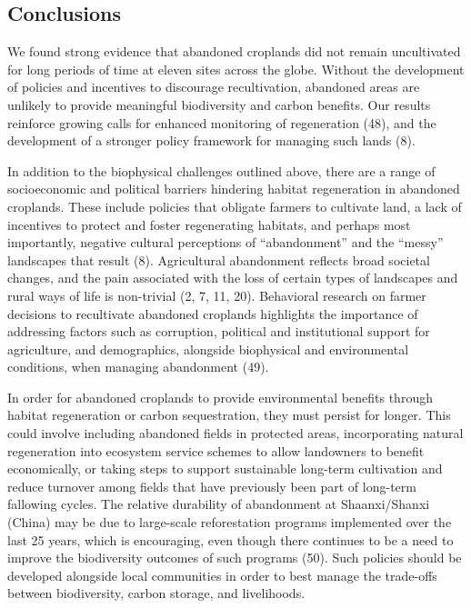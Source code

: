 \documentclass[9pt,twocolumn,twoside,]{pnas-new}
\begin{document}
\hypertarget{conclusions}{%
\subsection{Conclusions}\label{conclusions}}

We found strong evidence that abandoned croplands did not remain
uncultivated for long periods of time at eleven sites across the globe.
Without the development of policies and incentives to discourage
recultivation, abandoned areas are unlikely to provide meaningful
biodiversity and carbon benefits. Our results reinforce growing calls
for enhanced monitoring of regeneration (48), and the development of a
stronger policy framework for managing such lands (8).

In addition to the biophysical challenges outlined above, there are a
range of socioeconomic and political barriers hindering habitat
regeneration in abandoned croplands. These include policies that
obligate farmers to cultivate land, a lack of incentives to protect and
foster regenerating habitats, and perhaps most importantly, negative
cultural perceptions of ``abandonment'' and the ``messy'' landscapes
that result (8). Agricultural abandonment reflects broad societal
changes, and the pain associated with the loss of certain types of
landscapes and rural ways of life is non-trivial (2, 7, 11, 20).
Behavioral research on farmer decisions to recultivate abandoned
croplands highlights the importance of addressing factors such as
corruption, political and institutional support for agriculture, and
demographics, alongside biophysical and environmental conditions, when
managing abandonment (49).

In order for abandoned croplands to provide environmental benefits
through habitat regeneration or carbon sequestration, they must persist
for longer. This could involve including abandoned fields in protected
areas, incorporating natural regeneration into ecosystem service schemes
to allow landowners to benefit economically, or taking steps to support
sustainable long-term cultivation and reduce turnover among fields that
have previously been part of long-term fallowing cycles. The relative
durability of abandonment at Shaanxi/Shanxi (China) may be due to
large-scale reforestation programs implemented over the last 25 years,
which is encouraging, even though there continues to be a need to
improve the biodiversity outcomes of such programs (50). Such policies
should be developed alongside local communities in order to best manage
the trade-offs between biodiversity, carbon storage, and livelihoods.
\end{document}
